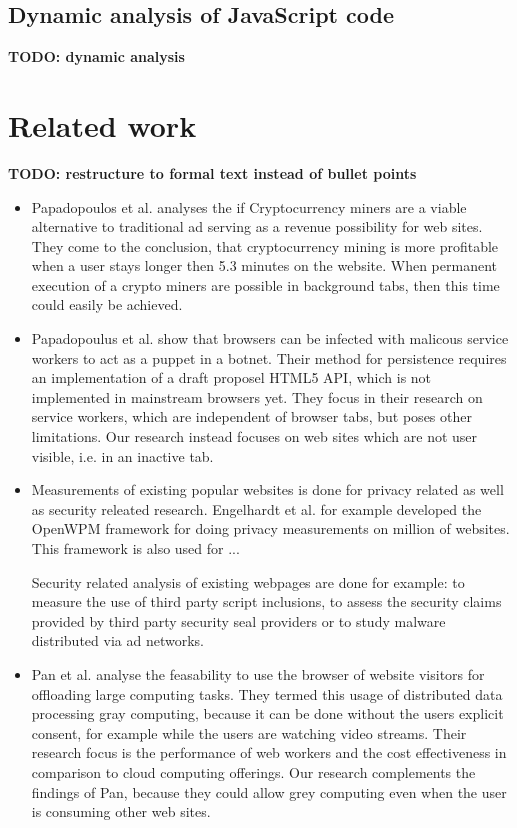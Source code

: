 \documentclass[
	ruledheaders=section,%
	class=report,%
	thesis={type=bachelor},%
	accentcolor=9c,%
	custommargins=true,%
	marginpar=false,%
	parskip=half-,%
	fontsize=11pt,%
]{tudapub}
\begin{document}
  \section{Dynamic analysis of JavaScript code}
  \textbf{TODO: dynamic analysis}

  
  \newpage
  \chapter{Related work}

  \textbf{TODO: restructure to formal text instead of bullet points}

  \begin{itemize}

  \item Papadopoulos et al.\autocite{papadopoulos2018truth} analyses the if Cryptocurrency miners are a viable alternative to traditional ad serving as a revenue possibility for web sites. They come to the conclusion, that cryptocurrency mining is more profitable when a user stays longer then 5.3 minutes on the website. When permanent execution of a crypto miners are possible in background tabs, then this time could easily be achieved.

  \item Papadopoulus et al.\cite{papadopoulos2018master} show that browsers can be infected with malicous service workers to act as a puppet in a botnet. Their method for persistence requires an implementation of a draft proposel HTML5 API, which is not implemented in mainstream browsers yet. They focus in their research on service workers, which are independent of browser tabs, but poses other limitations. Our research instead focuses on web sites which are not user visible, i.e. in an inactive tab.   

    
  \item Measurements of existing popular websites is done for privacy related as well as security releated research. Engelhardt et al.\cite{englehardt2016online} for example developed the OpenWPM framework for doing privacy measurements on million of websites. This framework is also used for ...

    Security related analysis of existing webpages are done for example: to measure the use of third party script inclusions\cite{nikiforakis2012you}, to assess the security claims provided by third party security seal providers\cite{van2014clubbing} or to study malware distributed via ad networks\cite{zarras2014dark}.


  \item Pan et al. analyse the feasability to use the browser of website visitors for offloading large computing tasks\cite{pan2015gray}. They termed this usage of distributed data processing gray computing, because it can be done without the users explicit consent, for example while the users are watching video streams. Their research focus is the performance of web workers and the cost effectiveness in comparison to cloud computing offerings. Our research complements the findings of Pan, because they could allow grey computing even when the user is consuming other web sites.

    
  \end{itemize}
\end{document}
